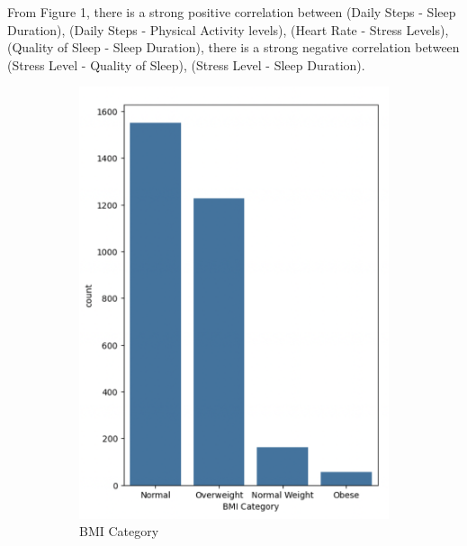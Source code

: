 \documentclass[10pt,twocolumn,letterpaper]{article}
\begin{document}
From Figure 1, there is a strong positive correlation between (Daily Steps - Sleep Duration), (Daily Steps - Physical Activity levels), (Heart Rate - Stress Levels), (Quality of Sleep - Sleep Duration), there is a strong negative correlation between (Stress Level - Quality of Sleep), (Stress Level - Sleep Duration).
\begin{figure}[H]
    \centering
      \begin{subfigure}{.3\textwidth}
  
  \includegraphics[width=.7\linewidth]{countplot1.png}
  \caption{BMI Category}
  
  \label{fig:sub1}
\end{subfigure}%
\begin{subfigure}{.3\textwidth}
  

\end{subfigure}
\end{figure}
\end{document}
